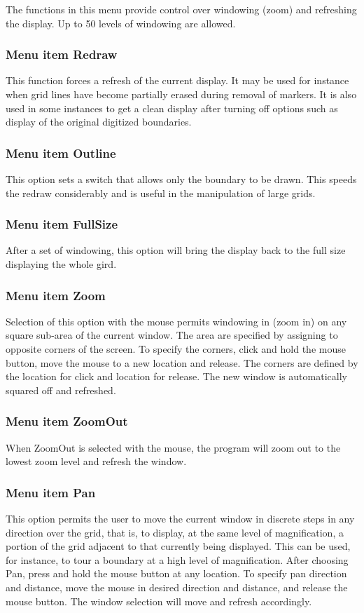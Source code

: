 \documentclass{article}
\begin{document}
The functions in this menu provide control over windowing (zoom) and refreshing the display. Up to 50 levels of windowing are allowed.

\subsubsection{Menu item Redraw}
This function forces a refresh of the current display. It may be used for instance when grid lines have become partially erased during removal of markers. It is also used in some instances to get a clean display after turning off options such as display of the original digitized boundaries.

\subsubsection{Menu item Outline}
This option sets a switch that allows only the boundary to be drawn. This speeds the redraw considerably and is useful in the manipulation of large grids.

\subsubsection{Menu item FullSize}
After a set of windowing, this option will bring the display back to the full size displaying the whole gird.

\subsubsection{Menu item Zoom}
Selection of this option with the mouse permits windowing in (zoom in) on any square sub-area of the current window. The area are specified by assigning to opposite corners of the screen. To specify the corners, click and hold the mouse button, move the mouse to a new location and release. The corners are defined by the location for click and location for release. The new window is automatically squared off and refreshed.

\subsubsection{Menu item ZoomOut}
When ZoomOut is selected with the mouse, the program will zoom out to the lowest zoom level and refresh the window. 

\subsubsection{Menu item Pan}
This option permits the user to move the current window in discrete steps in any direction over the grid, that is, to display, at the same level of magnification, a portion of the grid adjacent to that currently being displayed. This can be used, for instance, to tour a boundary at a high level of magnification. After choosing Pan, press and hold the mouse button at any location. To specify pan direction and distance, move the mouse in desired direction and distance, and release the mouse button. The window selection will move and refresh accordingly.
\end{document}
